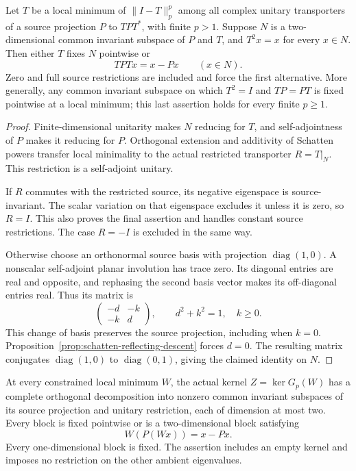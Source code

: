 \begin{proposition}
\label{prop:schatten-intrinsic-reflecting-plane}
Let $T$ be a local minimum of $\|I-T\|_p^p$ among all complex unitary
transporters of a source projection $P$ to $TPT^*$, with finite $p>1$.
Suppose $N$ is a two-dimensional common invariant subspace of $P$ and
$T$, and $T^2x=x$ for every $x\in N$. Then either $T$ fixes $N$
pointwise or
\[
 TPTx=x-Px\qquad(x\in N).
\]
Zero and full source restrictions are included and force the first
alternative. More generally, any common invariant subspace on which
$T^2=I$ and $TP=PT$ is fixed pointwise at a local minimum; this last
assertion holds for every finite $p\geq1$.
\end{proposition}

\begin{proof}
Finite-dimensional unitarity makes $N$ reducing for $T$, and
self-adjointness of $P$ makes it reducing for $P$. Orthogonal extension
and additivity of Schatten powers transfer local minimality to the
actual restricted transporter $R=T|_N$. This restriction is a
self-adjoint unitary.

If $R$ commutes with the restricted source, its negative eigenspace is
source-invariant. The scalar variation on that eigenspace excludes it
unless it is zero, so $R=I$. This also proves the final assertion and
handles constant source restrictions. The case $R=-I$ is excluded in
the same way.

Otherwise choose an orthonormal source basis with projection
$\operatorname{diag}(1,0)$. A nonscalar self-adjoint planar involution
has trace zero. Its diagonal entries are real and opposite, and
rephasing the second basis vector makes its off-diagonal entries real.
Thus its matrix is
\[
 \begin{pmatrix}-d&-k\\-k&d\end{pmatrix},
 \qquad d^2+k^2=1,\quad k\geq0.
\]
This change of basis preserves the source projection, including when
$k=0$. Proposition~\ref{prop:schatten-reflecting-descent} forces $d=0$.
The resulting matrix conjugates $\operatorname{diag}(1,0)$ to
$\operatorname{diag}(0,1)$, giving the claimed identity on $N$.
\end{proof}

\begin{corollary}
\label{cor:schatten-kernel-fixed-right}
At every constrained local minimum $W$, the actual kernel
$Z=\ker G_p(W)$ has a complete orthogonal decomposition into nonzero
common invariant subspaces of its source projection and unitary
restriction, each of dimension at most two. Every block is fixed
pointwise or is a two-dimensional block satisfying
\[
 W(P(Wx))=x-Px.
\]
Every one-dimensional block is fixed. The assertion includes an empty
kernel and imposes no restriction on the other ambient eigenvalues.
\end{corollary}

